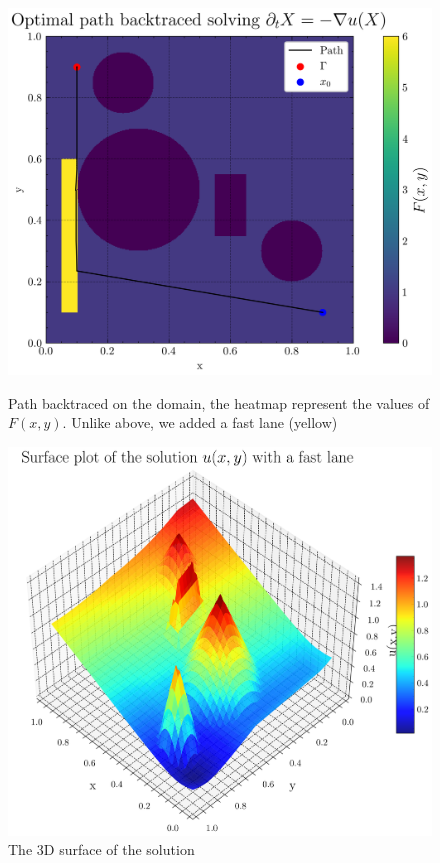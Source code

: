 \documentclass[11pt]{article}
\theoremstyle{definition}
\theoremstyle{remark}
\begin{document}
\FloatBarrier

\begin{figure}[h]
  \centering
  \begin{minipage}{0.45\textwidth}
    \centering
    \includegraphics[width=\textwidth]{plots/path_mountain_fast_lane.png}
    \caption{Path backtraced on the domain, the heatmap represent the values of $F(x,y)$. Unlike above, we added a fast lane (yellow)}
  \end{minipage}
  \hfill
  \begin{minipage}{0.45\textwidth}
    \centering
    \includegraphics[width=\textwidth]{plots/surface_mountain_fast_lane.png}
    \caption{The 3D surface of the solution}
    \label{3d_surface_mountain_fast_lane}
  \end{minipage}
\end{figure}
\FloatBarrier
\end{document}
